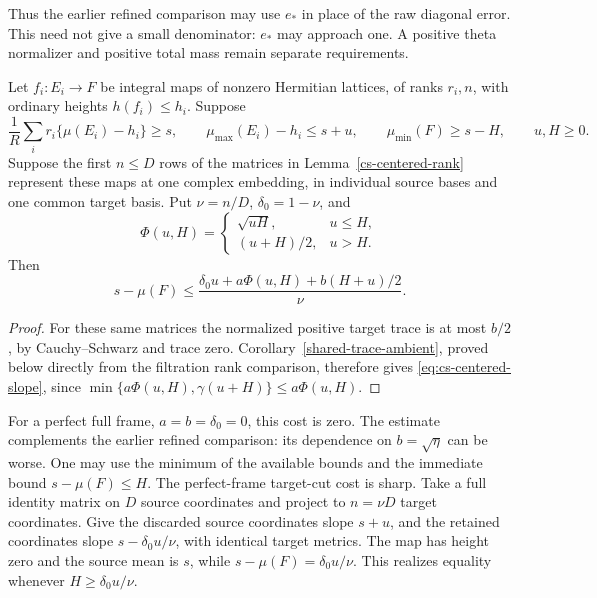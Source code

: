 Thus the earlier refined comparison may use $e_*$ in place of the
raw diagonal error. This need not give a small denominator:
$e_*$ may approach one. A positive theta normalizer and positive total
mass remain separate requirements.

\begin{proposition}
\label{cs-centered-slope}
Let $f_i:E_i\to F$ be integral maps of nonzero Hermitian lattices,
of ranks $r_i,n$, with ordinary heights $h(f_i)\le h_i$.
Suppose
\[
 \frac1R\sum_i r_i\{\mu(E_i)-h_i\}\ge s,\qquad
 \mu_{\max}(E_i)-h_i\le s+u,\qquad
 \mu_{\min}(F)\ge s-H,
 \qquad u,H\ge0.
\]
Suppose the first $n\le D$ rows of the matrices in
Lemma~\ref{cs-centered-rank} represent these maps at one complex
embedding, in individual source bases and one common target basis.
Put $\nu=n/D$, $\delta_0=1-\nu$, and
\[
 \Phi(u,H)=
 \begin{cases}
  \sqrt{uH},&u\le H,\\
  (u+H)/2,&u>H.
 \end{cases}
\]
Then
\begin{equation}\label{eq:cs-centered-slope}
 s-\mu(F)\le
 \frac{\delta_0u+a\Phi(u,H)+b(H+u)/2}{\nu}.
\end{equation}
\end{proposition}
\begin{proof}
For these same matrices the normalized positive target trace is at most
$b/2$, by Cauchy--Schwarz and trace zero. Corollary~\ref{shared-trace-ambient},
proved below directly from the filtration rank comparison, therefore gives
\eqref{eq:cs-centered-slope}, since
$\min\{a\Phi(u,H),\gamma(u+H)\}\le a\Phi(u,H)$.
\end{proof}

For a perfect full frame, $a=b=\delta_0=0$, this cost is zero.
The estimate complements the earlier refined comparison: its
dependence on $b=\sqrt\eta$ can be worse. One may use the minimum
of the available bounds and the immediate bound $s-\mu(F)\le H$.
The perfect-frame target-cut cost is sharp. Take a full identity
matrix on $D$ source coordinates and project to $n=\nu D$ target
coordinates. Give the discarded source coordinates slope $s+u$,
and the retained coordinates slope $s-\delta_0u/\nu$, with identical
target metrics. The map has height zero and the source mean is $s$,
while $s-\mu(F)=\delta_0u/\nu$. This realizes equality whenever
$H\ge\delta_0u/\nu$.

